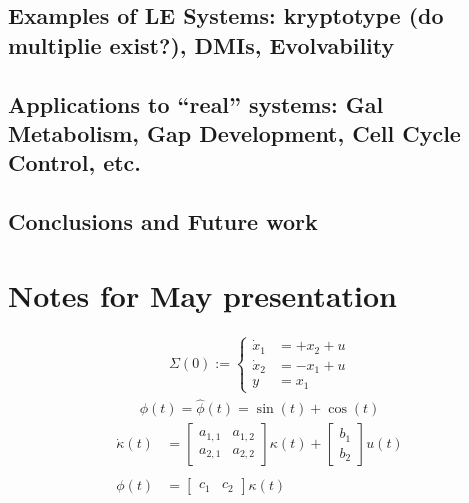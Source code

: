 \documentclass[11 pt]{article}
\newcommand{\1}{\mathbbm{1}}
\begin{document}
     \subsection{Examples of LE Systems: kryptotype (do multiplie exist?), DMIs, Evolvability}

     \subsection{Applications to ``real'' systems: Gal Metabolism, Gap Development, Cell Cycle Control, etc.}

     \subsection{Conclusions and Future work}

     \section{Notes for May presentation}
    \begin{align*}
      \Sigma(0) := \left\{ \begin{array}{ll}
      \dot{x}_{1} &= +x_{2} + u \\
      \dot{x}_{2} &= -x_{1} + u \\
      y &= x_{1}
      \end{array} \right.
    \end{align*}
\newpage
      \begin{align*}
       \phi(t) = \widehat\phi(t) = \sin(t) + \cos(t)
      \end{align*}
      \begin{align*}
        \dot{\kappa}(t) &= \begin{bmatrix} a_{1,1} & a_{1,2} \\ a_{2,1} & a_{2,2} \end{bmatrix} \kappa(t) + \begin{bmatrix} b_{1} \\ b_{2} \end{bmatrix} u(t) \\ \\
          \phi(t) &= \begin{bmatrix} c_{1} & c_{2} \end{bmatrix} \kappa(t) 
      \end{align*}
\end{document}
